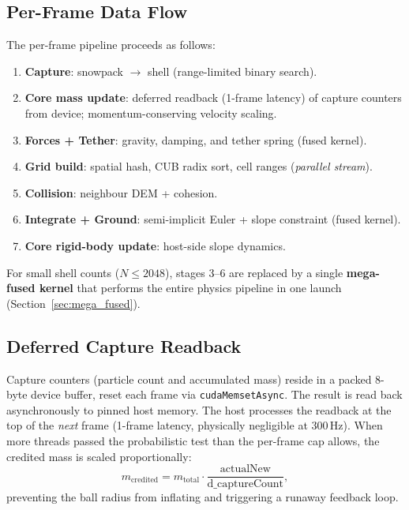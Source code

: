 \subsection{Per-Frame Data Flow}
\label{sec:dataflow}

The per-frame pipeline proceeds as follows:

\begin{enumerate}
  \item \textbf{Capture}: snowpack $\to$ shell (range-limited binary search).
  \item \textbf{Core mass update}: deferred readback (1-frame latency) of
        capture counters from device; momentum-conserving velocity scaling.
  \item \textbf{Forces + Tether}: gravity, damping, and tether spring
        (fused kernel).
  \item \textbf{Grid build}: spatial hash, CUB radix sort, cell ranges
        (\emph{parallel stream}).
  \item \textbf{Collision}: neighbour DEM + cohesion.
  \item \textbf{Integrate + Ground}: semi-implicit Euler + slope constraint
        (fused kernel).
  \item \textbf{Core rigid-body update}: host-side slope dynamics.
\end{enumerate}

For small shell counts ($N \leq 2048$), stages 3--6 are replaced by a
single \textbf{mega-fused kernel} that performs the entire physics pipeline
in one launch (Section~\ref{sec:mega_fused}).

\subsection{Deferred Capture Readback}
\label{sec:deferred}

Capture counters (particle count and accumulated mass) reside in a packed
8-byte device buffer, reset each frame via \texttt{cudaMemsetAsync}. The
result is read back asynchronously to pinned host memory. The host processes
the readback at the top of the \emph{next} frame (1-frame latency, physically
negligible at 300\,Hz). When more threads passed the probabilistic test than
the per-frame cap allows, the credited mass is scaled proportionally:
%
\begin{equation}
  m_{\text{credited}} = m_{\text{total}} \cdot
  \frac{\text{actualNew}}{\text{d\_captureCount}},
  \label{eq:mass_scaling}
\end{equation}
%
preventing the ball radius from inflating and triggering a runaway feedback
loop.
